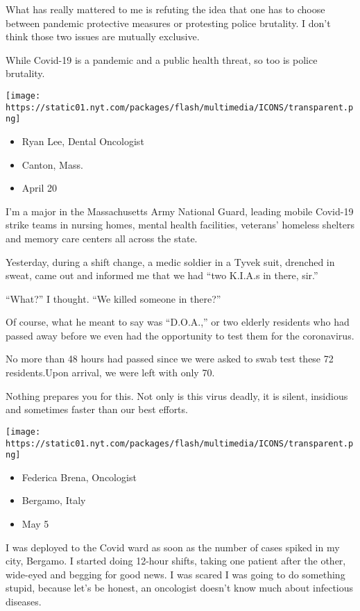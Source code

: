 What has really mattered to me is refuting the idea that one has to
choose between pandemic protective measures or protesting police
brutality. I don't think those two issues are mutually exclusive.

While Covid-19 is a pandemic and a public health threat, so too is
police brutality.

\texttt{[image: https://static01.nyt.com/packages/flash/multimedia/ICONS/transparent.png]}

\begin{itemize}
\tightlist
\item
  Ryan Lee, Dental Oncologist
\item
  Canton, Mass.
\item
  April 20
\end{itemize}

I'm a major in the Massachusetts Army National Guard, leading mobile
Covid-19 strike teams in nursing homes, mental health facilities,
veterans' homeless shelters and memory care centers all across the
state.

Yesterday, during a shift change, a medic soldier in a Tyvek suit,
drenched in sweat, came out and informed me that we had ``two K.I.A.s in
there, sir.''

``What?'' I thought. ``We killed someone in there?''

Of course, what he meant to say was ``D.O.A.,'' or two elderly residents
who had passed away before we even had the opportunity to test them for
the coronavirus.

No more than 48 hours had passed since we were asked to swab test these
72 residents.Upon arrival, we were left with only 70.

Nothing prepares you for this. Not only is this virus deadly, it is
silent, insidious and sometimes faster than our best efforts.

\texttt{[image: https://static01.nyt.com/packages/flash/multimedia/ICONS/transparent.png]}

\begin{itemize}
\tightlist
\item
  Federica Brena, Oncologist
\item
  Bergamo, Italy
\item
  May 5
\end{itemize}

I was deployed to the Covid ward as soon as the number of cases spiked
in my city, Bergamo. I started doing 12-hour shifts, taking one patient
after the other, wide-eyed and begging for good news. I was scared I was
going to do something stupid, because let's be honest, an oncologist
doesn't know much about infectious diseases.

